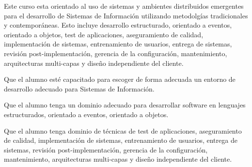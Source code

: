 \begin{syllabus}


\begin{justification}
Este curso esta orientado al uso de sistemas y ambientes distribuidos emergentes para el desarrollo de Sistemas de Información utilizando metodolgías tradicionales y contemporáneas. Esto incluye desarrollo estructurado, orientado a eventos, orientado a objetos, test de aplicaciones, aseguramiento de calidad, implementación de sistemas, entrenamiento de usuarios, entrega de sistemas, revisión post-implementación, gerencia de la configuración, mantenimiento, arquitecturas multi-capas y diseño independiente del cliente.
\end{justification}

\begin{goals}
\item Que el alumno esté capacitado para escoger de forma adecuada un entorno de desarrollo adecuado para Sistemas de Información.
\item Que el alumno tenga un dominio adecuado para desarrollar software en lenguajes estructurados, orientado a eventos, orientado a objetos.
\item Que el alumno tenga dominio de técnicas de test de aplicaciones, aseguramiento de calidad, implementación de sistemas, entrenamiento de usuarios, entrega de sistemas, revisión post-implementación, gerencia de la configuración, mantenimiento, arquitecturas multi-capas y diseño independiente del cliente.
\end{goals}

\begin{outcomes}
\end{outcomes}


\end{syllabus}
